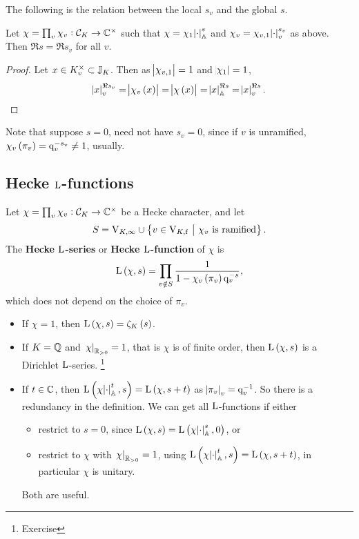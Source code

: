 The following is the relation between the local $ s_v $ and the global $ s $.

\begin{proposition}
Let $ \chi = \prod_v \chi_v : \mathcal{C}_K \to \mathbb{C}^\times $ such that $ \chi = \chi_1\abs{\cdot}_{\mathbb{A}}^s $ and $ \chi_v = \chi_{v, 1}\abs{\cdot}_v^{s_v} $ as above. Then $ \Re s = \Re s_v $ for all $ v $.
\end{proposition}

\begin{proof}
Let $ x \in K_v^\times \subset \mathbb{J}_K $. Then as $ \abs{\chi_{v, 1}} = 1 $ and $ \abs{\chi_1} = 1 $,
$$ \abs{x}_v^{\Re s_v} = \abs{\chi_v\br{x}} = \abs{\chi\br{x}} = \abs{x}_\AA^{\Re s} = \abs{x}_v^{\Re s}. $$
\end{proof}

Note that suppose $ s = 0 $, need not have $ s_v = 0 $, since if $ v $ is unramified, $ \chi_v\br{\pi_v} = \q_v^{-s_v} \ne 1 $, usually.

\pagebreak

\subsection{Hecke \texorpdfstring{$ \mathrm{L} $}{L}-functions}

\begin{definition*}
Let $ \chi = \prod_v \chi_v : \mathcal{C}_K \to \mathbb{C}^\times $ be a Hecke character, and let
$$ S = \V_{K, \infty} \cup \cbr{v \in \V_{K, \f} \st \chi_v \ \text{is ramified}}. $$
The \textbf{Hecke $ \mathrm{L} $-series} or \textbf{Hecke $ \mathrm{L} $-function} of $ \chi $ is
$$ \L\br{\chi, s} = \prod_{v \notin S} \dfrac{1}{1 - \chi_v\br{\pi_v}\q_v^{-s}}, $$
which does not depend on the choice of $ \pi_v $.
\end{definition*}

\begin{remark*}
\hfill
\begin{itemize}
\item If $ \chi = 1 $, then $ \L\br{\chi, s} = \zeta_K\br{s} $.
\item If $ K = \mathbb{Q} $ and $ \left. \chi \right|_{\mathbb{R}_{> 0}} = 1 $, that is $ \chi $ is of finite order, then $ \L\br{\chi, s} $ is a Dirichlet $ \mathrm{L} $-series. \footnote{Exercise}
\item If $ t \in \mathbb{C} $, then $ \L\br{\chi\abs{\cdot}_\AA^t, s} = \L\br{\chi, s + t} $ as $ \abs{\pi_v}_v = \mathrm{q}_v^{-1} $. So there is a redundancy in the definition. We can get all $ \mathrm{L} $-functions if either
\begin{itemize}
\item restrict to $ s = 0 $, since $ \L\br{\chi, s} = \L\br{\chi\abs{\cdot}_\AA^s, 0} $, or
\item restrict to $ \chi $ with $ \left. \chi \right|_{\mathbb{R}_{> 0}} = 1 $, using $ \L\br{\chi\abs{\cdot}_\AA^t, s} = \L\br{\chi, s + t} $, in particular $ \chi $ is unitary.
\end{itemize}
Both are useful.
\end{itemize}
\end{remark*}

